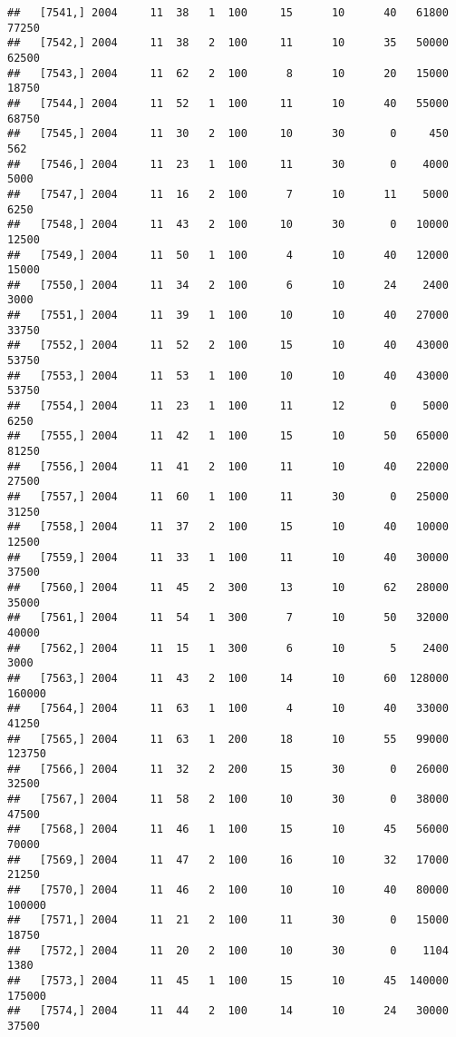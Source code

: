 \documentclass{article}\usepackage[]{graphicx}\usepackage[]{color}
\makeatletter
\newenvironment{kframe}{%
 \def\at@end@of@kframe{}%
 \ifinner\ifhmode%
  \def\at@end@of@kframe{\end{minipage}}%
  \begin{minipage}{\columnwidth}%
 \fi\fi%
 \def\FrameCommand##1{\hskip\@totalleftmargin \hskip-\fboxsep
 \colorbox{shadecolor}{##1}\hskip-\fboxsep
     \hskip-\linewidth \hskip-\@totalleftmargin \hskip\columnwidth}%
 \MakeFramed {\advance\hsize-\width
   \@totalleftmargin\z@ \linewidth\hsize
   \@setminipage}}%
 {\par\unskip\endMakeFramed%
 \at@end@of@kframe}
\newenvironment{knitrout}{}{} %
\makeatother
\begin{document}
\begin{knitrout}
\begin{kframe}
\begin{verbatim}
##   [7541,] 2004     11  38   1  100     15      10      40   61800   77250
##   [7542,] 2004     11  38   2  100     11      10      35   50000   62500
##   [7543,] 2004     11  62   2  100      8      10      20   15000   18750
##   [7544,] 2004     11  52   1  100     11      10      40   55000   68750
##   [7545,] 2004     11  30   2  100     10      30       0     450     562
##   [7546,] 2004     11  23   1  100     11      30       0    4000    5000
##   [7547,] 2004     11  16   2  100      7      10      11    5000    6250
##   [7548,] 2004     11  43   2  100     10      30       0   10000   12500
##   [7549,] 2004     11  50   1  100      4      10      40   12000   15000
##   [7550,] 2004     11  34   2  100      6      10      24    2400    3000
##   [7551,] 2004     11  39   1  100     10      10      40   27000   33750
##   [7552,] 2004     11  52   2  100     15      10      40   43000   53750
##   [7553,] 2004     11  53   1  100     10      10      40   43000   53750
##   [7554,] 2004     11  23   1  100     11      12       0    5000    6250
##   [7555,] 2004     11  42   1  100     15      10      50   65000   81250
##   [7556,] 2004     11  41   2  100     11      10      40   22000   27500
##   [7557,] 2004     11  60   1  100     11      30       0   25000   31250
##   [7558,] 2004     11  37   2  100     15      10      40   10000   12500
##   [7559,] 2004     11  33   1  100     11      10      40   30000   37500
##   [7560,] 2004     11  45   2  300     13      10      62   28000   35000
##   [7561,] 2004     11  54   1  300      7      10      50   32000   40000
##   [7562,] 2004     11  15   1  300      6      10       5    2400    3000
##   [7563,] 2004     11  43   2  100     14      10      60  128000  160000
##   [7564,] 2004     11  63   1  100      4      10      40   33000   41250
##   [7565,] 2004     11  63   1  200     18      10      55   99000  123750
##   [7566,] 2004     11  32   2  200     15      30       0   26000   32500
##   [7567,] 2004     11  58   2  100     10      30       0   38000   47500
##   [7568,] 2004     11  46   1  100     15      10      45   56000   70000
##   [7569,] 2004     11  47   2  100     16      10      32   17000   21250
##   [7570,] 2004     11  46   2  100     10      10      40   80000  100000
##   [7571,] 2004     11  21   2  100     11      30       0   15000   18750
##   [7572,] 2004     11  20   2  100     10      30       0    1104    1380
##   [7573,] 2004     11  45   1  100     15      10      45  140000  175000
##   [7574,] 2004     11  44   2  100     14      10      24   30000   37500

\end{verbatim}
\end{kframe}
\end{knitrout}
\end{document}
